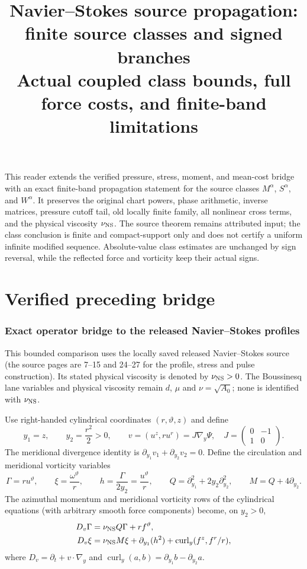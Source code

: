 \documentclass[11pt]{article}
\title{Navier--Stokes source propagation: finite source classes and signed branches\\
Actual coupled class bounds, full force costs, and finite-band limitations}
\author{}\date{}
\begin{document}
\maketitle
This reader extends the verified pressure, stress, moment, and mean-cost bridge
with an exact finite-band propagation statement for the source classes
$M^\alpha$, $S^\alpha$, and $W^\alpha$. It preserves the original chart
powers, phase arithmetic, inverse matrices, pressure cutoff tail, old locally
finite family, all nonlinear cross terms, and the physical viscosity
$\nu_{\rm NS}$. The source theorem remains attributed input; the class
conclusion is finite and compact-support only and does not certify a uniform
infinite modified sequence. Absolute-value class estimates are unchanged by
sign reversal, while the reflected force and vorticity keep their actual signs.
\tableofcontents\clearpage
\part{Verified preceding bridge}
\section{Exact operator bridge to the released Navier--Stokes profiles}
\label{nsbridge:nsb:operator}

This bounded comparison uses the locally saved released Navier--Stokes source
(the source pages are 7--15 and 24--27 for the profile, stress and pulse
construction). Its stated physical viscosity is denoted by $\nu_{\rm NS}>0$.
The Boussinesq lane variables and physical viscosity remain $d$, $\mu$ and
$\nu=\sqrt{A_0}$; none is identified with $\nu_{\rm NS}$.

Use right-handed cylindrical coordinates $(r,\vartheta,z)$ and define
\[
 y_1=z,\qquad y_2=\frac{r^2}{2}>0,\qquad
 v=(u^z,ru^r)=J\nabla_y\Psi,
 \quad J=\begin{pmatrix}0&-1\\1&0\end{pmatrix}.
\]
The meridional divergence identity is
$\partial_{y_1}v_1+\partial_{y_2}v_2=0$. Define the circulation and
meridional vorticity variables
\[
 \Gamma=ru^\vartheta,
 \qquad \xi=\frac{\omega^\vartheta}{r},
 \qquad h=\frac{\Gamma}{2y_2}=\frac{u^\vartheta}{r},
 \qquad Q=\partial_{y_1}^2+2y_2\partial_{y_2}^2,
 \qquad M=Q+4\partial_{y_2}.
\]
The azimuthal momentum and meridional vorticity rows of the cylindrical
equations (with arbitrary smooth force components) become, on $y_2>0$,
\begin{align}
 D_v\Gamma&=\nu_{\rm NS}Q\Gamma+r f^\vartheta,
 \label{nsbridge:nsb:Gamma}\\
 D_v\xi&=\nu_{\rm NS}M\xi+\partial_{y_1}(h^2)
       +\operatorname{curl}_y(f^z,f^r/r),
 \label{nsbridge:nsb:xi}
\end{align}
where $D_v=\partial_t+v\cdot\nabla_y$ and
$\operatorname{curl}_y(a,b)=\partial_{y_1}b-\partial_{y_2}a$.
\end{document}
